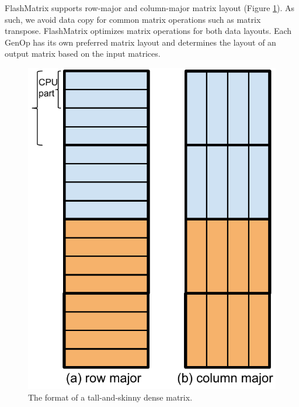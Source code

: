 FlashMatrix supports row-major and column-major matrix layout (Figure
\ref{fig:tas_mat}). As such, we avoid data copy for common matrix operations
such as matrix transpose. FlashMatrix optimizes matrix operations for both
data layouts. Each GenOp has its own preferred matrix layout and determines
the layout of an output matrix based on the input matrices.

\begin{figure}
	\centering
	\includegraphics[scale=0.5]{FlashMatrix_figs/dense_matrix2.pdf}
	\caption{The format of a tall-and-skinny dense matrix.}
	\label{fig:tas_mat}
\end{figure}

